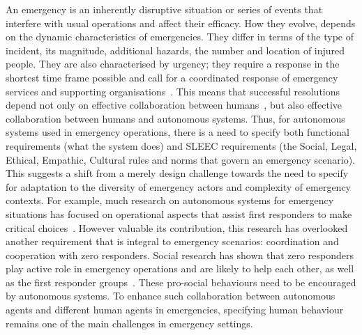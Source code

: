 \documentclass[sigconf]{acmart}
\begin{document}
An emergency is an inherently disruptive situation or series of events that interfere with usual operations and affect their efficacy. How they evolve, depends on the dynamic characteristics of emergencies. They differ in terms of the type of incident, its magnitude, additional hazards, the number and location of injured people. They are also characterised by urgency; they require a response in the shortest time frame possible and call for a coordinated response of emergency services and supporting organisations~\cite{cabinet2013emergency}. This means that successful resolutions depend not only on effective collaboration between humans~\cite{james2011organizational}, but also effective collaboration between humans and autonomous systems. Thus, for autonomous systems used in emergency operations, there is a need to specify both functional requirements (what the system does) and SLEEC requirements (the Social, Legal, Ethical, Empathic, Cultural rules and norms that govern an emergency scenario). This suggests a shift from a merely design challenge towards the need to specify for adaptation to the diversity of emergency actors and complexity of emergency contexts. For example, much research on autonomous systems for emergency situations has focused on operational aspects that assist first responders to make critical choices~\cite{graven2017managing}. However valuable its contribution, this research has overlooked another requirement that is integral to emergency scenarios: coordination and cooperation with zero responders. Social research has shown that zero responders play active role in emergency operations and are likely to help each other, as well as the first responder groups~\cite{drury2018role}. These pro-social behaviours need to be encouraged by autonomous systems. To enhance such collaboration between autonomous agents and different human agents in emergencies, specifying human behaviour remains one of the main challenges in emergency settings.

\end{document}
